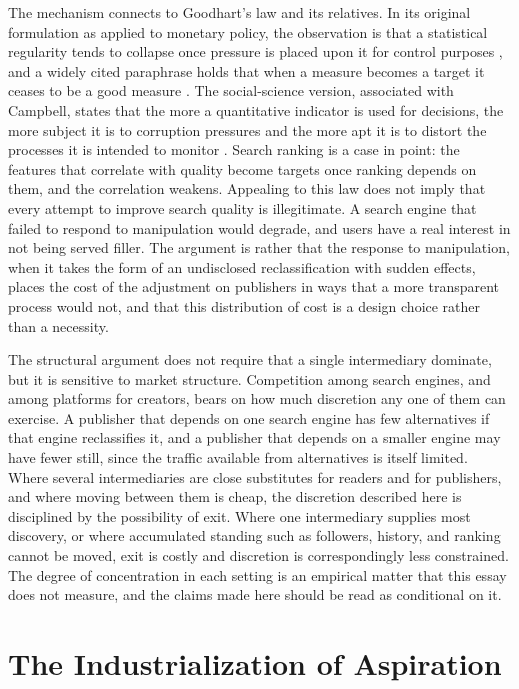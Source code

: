 \documentclass[11pt]{article}
\theoremstyle{remark}
\begin{document}
The mechanism connects to Goodhart's law and its relatives. In its original formulation as applied to monetary policy, the observation is that a statistical regularity tends to collapse once pressure is placed upon it for control purposes \cite{goodhart1975}, and a widely cited paraphrase holds that when a measure becomes a target it ceases to be a good measure \cite{strathern1997}. The social-science version, associated with Campbell, states that the more a quantitative indicator is used for decisions, the more subject it is to corruption pressures and the more apt it is to distort the processes it is intended to monitor \cite{campbell1979}. Search ranking is a case in point: the features that correlate with quality become targets once ranking depends on them, and the correlation weakens. Appealing to this law does not imply that every attempt to improve search quality is illegitimate. A search engine that failed to respond to manipulation would degrade, and users have a real interest in not being served filler. The argument is rather that the response to manipulation, when it takes the form of an undisclosed reclassification with sudden effects, places the cost of the adjustment on publishers in ways that a more transparent process would not, and that this distribution of cost is a design choice rather than a necessity.

The structural argument does not require that a single intermediary dominate, but it is sensitive to market structure. Competition among search engines, and among platforms for creators, bears on how much discretion any one of them can exercise. A publisher that depends on one search engine has few alternatives if that engine reclassifies it, and a publisher that depends on a smaller engine may have fewer still, since the traffic available from alternatives is itself limited. Where several intermediaries are close substitutes for readers and for publishers, and where moving between them is cheap, the discretion described here is disciplined by the possibility of exit. Where one intermediary supplies most discovery, or where accumulated standing such as followers, history, and ranking cannot be moved, exit is costly and discretion is correspondingly less constrained. The degree of concentration in each setting is an empirical matter that this essay does not measure, and the claims made here should be read as conditional on it.

\part{The Industrialization of Aspiration}
\end{document}
